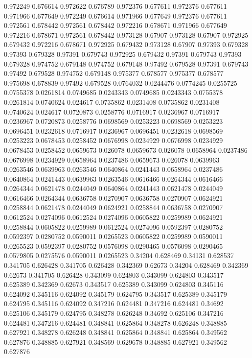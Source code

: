 0.972249 0.676614
0.972622 0.676789
0.972376 0.677611
0.972376 0.677611
0.971966 0.677649
0.972249 0.676614
0.971966 0.677649
0.972376 0.677611
0.972561 0.678442
0.972561 0.678442
0.972216 0.678671
0.971966 0.677649
0.972216 0.678671
0.972561 0.678442
0.973128 0.67907
0.973128 0.67907
0.972925 0.679432
0.972216 0.678671
0.972925 0.679432
0.973128 0.67907
0.97393 0.679328
0.97393 0.679328
0.97391 0.679743
0.972925 0.679432
0.97391 0.679743
0.97393 0.679328
0.974752 0.679148
0.974752 0.679148
0.97492 0.679528
0.97391 0.679743
0.97492 0.679528
0.974752 0.679148
0.975377 0.678577
0.975377 0.678577
0.975698 0.678839
0.97492 0.679528
0.0764032 0.0244476
0.0774245 0.0255725
0.0755378 0.0261814
0.0749685 0.0243343
0.0749685 0.0243343
0.0755378 0.0261814
0.0740624 0.024617
0.0735862 0.0231408
0.0735862 0.0231408
0.0740624 0.024617
0.0720873 0.0258776
0.0716917 0.0236967
0.0716917 0.0236967
0.0720873 0.0258776
0.0698569 0.0253223
0.0698569 0.0253223
0.0696451 0.0232618
0.0716917 0.0236967
0.0696451 0.0232618
0.0698569 0.0253223
0.0678453 0.0258452
0.0676998 0.0234929
0.0676998 0.0234929
0.0678453 0.0258452
0.0659673 0.026078
0.0659673 0.026078
0.0658964 0.0237486
0.0676998 0.0234929
0.0658964 0.0237486
0.0659673 0.026078
0.0639963 0.0263546
0.0639963 0.0263546
0.0640864 0.0241443
0.0658964 0.0237486
0.0640864 0.0241443
0.0639963 0.0263546
0.0616466 0.0264344
0.0616466 0.0264344
0.0621478 0.0244049
0.0640864 0.0241443
0.0621478 0.0244049
0.0616466 0.0264344
0.0636758 0.0270907
0.0636758 0.0270907
0.0624921 0.0258844
0.0621478 0.0244049
0.0624921 0.0258844
0.0636758 0.0270907
0.0612524 0.0274096
0.0612524 0.0274096
0.0605822 0.0259989
0.0624921 0.0258844
0.0605822 0.0259989
0.0612524 0.0274096
0.0592397 0.0280752
0.0592397 0.0280752
0.0590011 0.0265523
0.0605822 0.0259989
0.0590011 0.0265523
0.0592397 0.0280752
0.0576098 0.0290465
0.0576098 0.0290465
0.0579805 0.0275576
0.0590011 0.0265523
0.34204 0.628469
0.34131 0.628537
0.341705 0.626428
0.341705 0.626428
0.342369 0.62673
0.34204 0.628469
0.342369 0.62673
0.341705 0.626428
0.343099 0.624803
0.343099 0.624803
0.343517 0.625389
0.342369 0.62673
0.343517 0.625389
0.343099 0.624803
0.345116 0.624092
0.345116 0.624092
0.345179 0.624795
0.343517 0.625389
0.345179 0.624795
0.345116 0.624092
0.347216 0.624481
0.347216 0.624481
0.34692 0.625106
0.345179 0.624795
0.348278 0.626248
0.34692 0.625106
0.347216 0.624481
0.347216 0.624481
0.348841 0.625864
0.348278 0.626248
0.348885 0.627921
0.348278 0.626248
0.348841 0.625864
0.348841 0.625864
0.349562 0.627876
0.348885 0.627921
0.348569 0.629678
0.348885 0.627921
0.349562 0.627876
